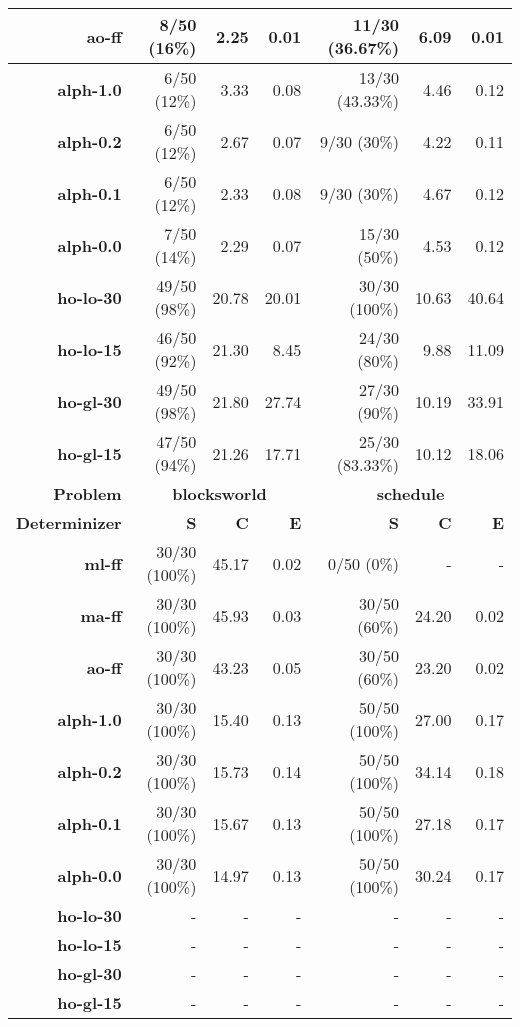 \documentclass[../root.tex]{subfiles}
\begin{document}
\begin{table}[tbp]
{\begin{tabular}{|r|r|r|r|r|r|r|}
\textbf{ao-ff} & 8/50 (16\%) & 2.25 & 0.01 & 11/30 (36.67\%) & 6.09 & 0.01 \\ \hline
\textbf{alph-1.0} & 6/50 (12\%) & 3.33 & 0.08 & 13/30 (43.33\%) & 4.46 & 0.12 \\ \hline
\textbf{alph-0.2} & 6/50 (12\%) & 2.67 & 0.07 & 9/30 (30\%) & 4.22 & 0.11 \\ \hline
\textbf{alph-0.1} & 6/50 (12\%) & 2.33 & 0.08 & 9/30 (30\%) & 4.67 & 0.12 \\ \hline
\textbf{alph-0.0} & 7/50 (14\%) & 2.29 & 0.07 & 15/30 (50\%) & 4.53 & 0.12 \\ \hline
\textbf{ho-lo-30} & 49/50 (98\%) & 20.78 & 20.01 & 30/30 (100\%) & 10.63 & 40.64 \\ \hline
\textbf{ho-lo-15} & 46/50 (92\%) & 21.30 & 8.45 & 24/30 (80\%) & 9.88 & 11.09 \\ \hline
\textbf{ho-gl-30} & 49/50 (98\%) & 21.80 & 27.74 & 27/30 (90\%) & 10.19 & 33.91 \\ \hline
\textbf{ho-gl-15} & 47/50 (94\%) & 21.26 & 17.71 & 25/30 (83.33\%) & 10.12 & 18.06 \\ \hline\hline
\textbf{Problem} & \multicolumn{ 3}{c|}{\textbf{blocksworld}} & \multicolumn{ 3}{c|}{\textbf{schedule}} \\ \hline
\textbf{Determinizer} & \textbf{S} & \textbf{C} & \textbf{E} & \textbf{S} & \textbf{C} & \textbf{E} \\ \hline
\textbf{ml-ff} & 30/30 (100\%) & 45.17 & 0.02 & 0/50 (0\%) & - & - \\ \hline
\textbf{ma-ff} & 30/30 (100\%) & 45.93 & 0.03 & 30/50 (60\%) & 24.20 & 0.02 \\ \hline
\textbf{ao-ff} & 30/30 (100\%) & 43.23 & 0.05 & 30/50 (60\%) & 23.20 & 0.02 \\ \hline
\textbf{alph-1.0} & 30/30 (100\%) & 15.40 & 0.13 & 50/50 (100\%) & 27.00 & 0.17 \\ \hline
\textbf{alph-0.2} & 30/30 (100\%) & 15.73 & 0.14 & 50/50 (100\%) & 34.14 & 0.18 \\ \hline
\textbf{alph-0.1} & 30/30 (100\%) & 15.67 & 0.13 & 50/50 (100\%) & 27.18 & 0.17 \\ \hline
\textbf{alph-0.0} & 30/30 (100\%) & 14.97 & 0.13 & 50/50 (100\%) & 30.24 & 0.17 \\ \hline
\textbf{ho-lo-30} & - & - & - & - & - & - \\ \hline
\textbf{ho-lo-15} & - & - & - & - & - & - \\ \hline
\textbf{ho-gl-30} & - & - & - & - & - & - \\ \hline
\textbf{ho-gl-15} & - & - & - & - & - & - \\ \hline
\end{tabular}}
\label{tab:results-determinization}
\end{table}
\end{document}
